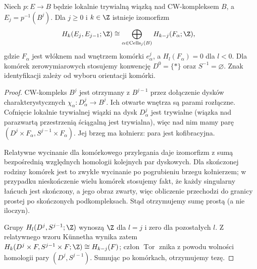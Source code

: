 \begin{lemat}
\label{lem:serre-cells-v5}
Niech $p:E\to B$ będzie lokalnie trywialną wiązką nad
CW-kompleksem $B$, a $E_j=p^{-1}(B^j)$.
Dla $j\ge0$ i $k\in\Z$ istnieje izomorfizm
\[
H_k(E_j,E_{j-1};\Z)\cong
\bigoplus_{\alpha\in\operatorname{Cells}_j(B)}H_{k-j}(F_\alpha;\Z),
\]
gdzie $F_\alpha$ jest włóknem nad wnętrzem komórki
$e^j_\alpha$, a $H_l(F_\alpha)=0$ dla $l<0$.
Dla komórek zerowymiarowych stosujemy konwencję
$D^0=\{*\}$ oraz $S^{-1}=\varnothing$.
Znak identyfikacji zależy od wyboru orientacji komórki.
\end{lemat}
\begin{proof}
CW-kompleks $B^j$ jest otrzymany z $B^{j-1}$ przez
dołączenie dysków charakterystycznych
$\chi_\alpha:D^j_\alpha\to B^j$. Ich otwarte wnętrza
są parami rozłączne. Cofnięcie lokalnie trywialnej wiązki
na dysk $D^j_\alpha$ jest trywialne (wiązka nad
parazwartą przestrzenią ściągalną jest trywialna), więc
nad nim mamy parę
$(D^j\times F_\alpha,S^{j-1}\times F_\alpha)$.
Jej brzeg ma kołnierz: para jest kofibracyjna.

Relatywne wycinanie dla komórkowego przylegania daje
izomorfizm z sumą bezpośrednią względnych homologii
kolejnych par dyskowych. Dla skończonej rodziny komórek
jest to zwykłe wycinanie po pogrubieniu brzegu kołnierzem;
w przypadku nieskończenie wielu komórek stosujemy fakt,
że każdy singularny łańcuch jest skończony, a jego obraz
zwarty, więc obliczenie przechodzi do granicy prostej
po skończonych podkompleksach. Stąd otrzymujemy sumę
prostą (a nie iloczyn).

Grupy $H_l(D^j,S^{j-1};\Z)$ wynoszą $\Z$ dla $l=j$
i zero dla pozostałych $l$. Z relatywnego wzoru
Künnetha wynika zatem
$H_k(D^j\times F,S^{j-1}\times F;\Z)\cong H_{k-j}(F)$;
człon $\operatorname{Tor}$ znika z powodu wolności
homologii pary $(D^j,S^{j-1})$.
Sumując po komórkach, otrzymujemy tezę.
\end{proof}

